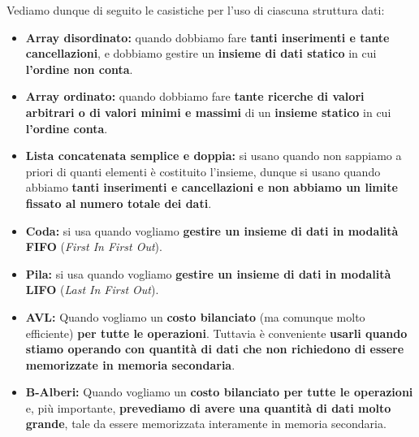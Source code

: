 \documentclass[12pt]{report}
\begin{document}
	\vspace{1em}
	Vediamo dunque di seguito le casistiche per l'uso di ciascuna struttura dati:
	\begin{itemize}
		\item \textbf{Array disordinato:} quando dobbiamo fare \textbf{tanti inserimenti e tante cancellazioni}, e dobbiamo gestire un \textbf{insieme di dati statico} in cui \textbf{l'ordine non conta}.
		\item \textbf{Array ordinato:} quando dobbiamo fare \textbf{tante ricerche di valori arbitrari o di valori minimi e massimi} di un \textbf{insieme statico} in cui \textbf{l'ordine conta}.
		\item \textbf{Lista concatenata semplice e doppia:} si usano quando non sappiamo a priori di quanti elementi è costituito l'insieme, dunque si usano quando abbiamo \textbf{tanti inserimenti e cancellazioni e non abbiamo un limite fissato al numero totale dei dati}.
		\item \textbf{Coda:} si usa quando vogliamo \textbf{gestire un insieme di dati in modalità FIFO} (\textit{First In First Out}).
		\item \textbf{Pila:} si usa quando vogliamo \textbf{gestire un insieme di dati in modalità LIFO} (\textit{Last In First Out}).
		\item \textbf{AVL:} Quando vogliamo un \textbf{costo bilanciato} (ma comunque molto efficiente) \textbf{per tutte le operazioni}. Tuttavia è conveniente \textbf{usarli quando stiamo operando con quantità di dati che non richiedono di essere memorizzate in memoria secondaria}.
		\item \textbf{B-Alberi:} Quando vogliamo un \textbf{costo bilanciato per tutte le operazioni} e, più importante, \textbf{prevediamo di avere una quantità di dati molto grande}, tale da essere memorizzata interamente in memoria secondaria.
	\end{itemize}
	
\end{document}
